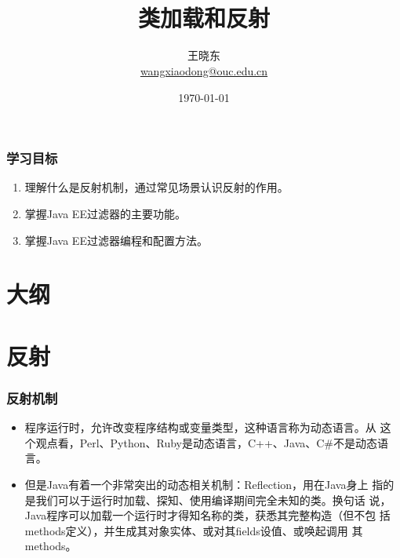 
\title[KevinW@OUC]{\\  
  类加载和反射}
\author[王晓东]{王晓东\\
  \href{mailto:wangxiaodong@ouc.edu.cn}{\footnotesize wangxiaodong@ouc.edu.cn}}
\date{\today}


\frame{\titlepage}
\begin{frame}
\frametitle{学习目标}
\begin{enumerate}
\item 理解什么是反射机制，通过常见场景认识反射的作用。
\item 掌握Java EE过滤器的主要功能。
\item 掌握Java EE过滤器编程和配置方法。
\end{enumerate}  
\end{frame}
 
\section*{大纲}


\section{反射}

\begin{frame}[fragile] %
\frametitle{反射机制}

\begin{itemize}
\item 程序运行时，允许改变程序结构或变量类型，这种语言称为动态语言。从
  这个观点看，Perl、Python、Ruby是动态语言，C++、Java、C\#不是动态语
  言。

\item 但是Java有着一个非常突出的动态相关机制：Reflection，用在Java身上
  指的是我们可以于运行时加载、探知、使用编译期间完全未知的类。换句话
  说，Java程序可以加载一个运行时才得知名称的类，获悉其完整构造（但不包
  括methods定义），并生成其对象实体、或对其fields设值、或唤起调用
  其methods。
\end{itemize}
\end{frame}

